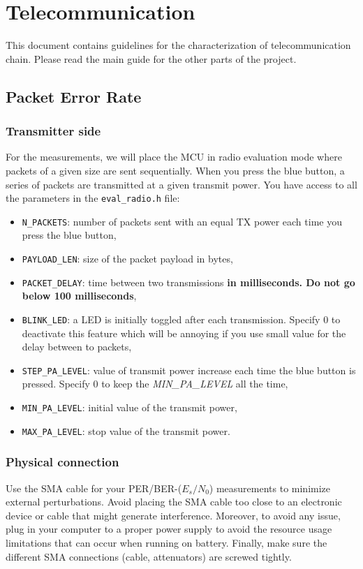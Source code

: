 \section{Telecommunication}

This document contains guidelines for the characterization of telecommunication chain. Please read the main guide for the other parts of the project.

\subsection{Packet Error Rate}


\subsubsection{Transmitter side}

For the measurements, we will place the MCU in radio evaluation mode where packets of a given size are sent sequentially. When you press the blue button,  a series of packets are transmitted at a given transmit power.
You have access to all the parameters in the \texttt{eval\_radio.h} file:
\begin{itemize}
    \item \texttt{N\_PACKETS}: number of packets sent with an equal TX power each time you press the blue button,
    \item \texttt{PAYLOAD\_LEN}: size of the packet payload in bytes,
    \item \texttt{PACKET\_DELAY}: time between two transmissions \textbf{in milliseconds. Do not go below 100 milliseconds},
    \item \texttt{BLINK\_LED}: a LED is initially toggled after each transmission. Specify 0 to deactivate this feature which will be annoying if you use small value for the delay between to packets,
    \item \texttt{STEP\_PA\_LEVEL}: value of transmit power increase each time the blue button is pressed. Specify 0 to keep the \textit{MIN\_PA\_LEVEL} all the time,
    \item \texttt{MIN\_PA\_LEVEL}: initial value of the transmit power,
    \item \texttt{MAX\_PA\_LEVEL}: stop value of the transmit power.
\end{itemize}


\subsubsection{Physical connection}
Use the SMA cable for your PER/BER-($E_s/N_0$) measurements to minimize external perturbations. Avoid placing the SMA cable too close to an electronic device or cable that might generate interference. Moreover, to avoid any issue, plug in your computer to a proper power supply to avoid the resource usage limitations that can occur when running on battery. Finally, make sure the different SMA connections (cable, attenuators) are screwed tightly.


